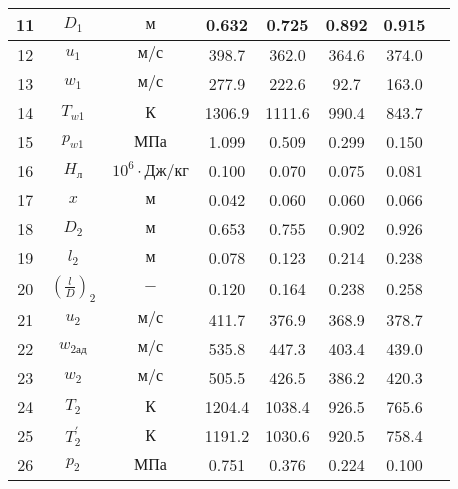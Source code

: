 \begin{landscape}
\begin{center}
\begin{longtable}{|c|c|c|c|c|c|c|c|}
            11 & $D_1$ & $м$ & 0.632 & 0.725 & 0.892 & 0.915 \\\hline
            
            12 & $u_1$ & $м/с$ & 398.7 & 362.0 & 364.6 & 374.0 \\\hline
            
            13 & $w_1$ & $м/с$ & 277.9 & 222.6 & 92.7 & 163.0 \\\hline
            
            14 & $T_{w1}$ & $К$ & 1306.9 & 1111.6 & 990.4 & 843.7 \\\hline
            
            15 & $p_{w1}$ & $МПа$ & 1.099 & 0.509 & 0.299 & 0.150 \\\hline
            
            16 & $H_л$ & $10^6 \cdot Дж/кг$ & 0.100 & 0.070 & 0.075 & 0.081 \\\hline
            
            17 & $x$ & $м$ & 0.042 & 0.060 & 0.060 & 0.066 \\\hline
            
            18 & $D_2$ & $м$ & 0.653 & 0.755 & 0.902 & 0.926 \\\hline
            
            19 & $l_2$ & $м$ & 0.078 & 0.123 & 0.214 & 0.238 \\\hline
            
            20 & $\left( \frac{l}{D} \right)_2$ & $-$ & 0.120 & 0.164 & 0.238 & 0.258 \\\hline
            
            21 & $u_2$ & $м/с$ & 411.7 & 376.9 & 368.9 & 378.7 \\\hline
            
            22 & $w_{2ад}$ & $м/с$ & 535.8 & 447.3 & 403.4 & 439.0 \\\hline
            
            23 & $w_2$ & $м/с$ & 505.5 & 426.5 & 386.2 & 420.3 \\\hline
            
            24 & $T_2$ & $К$ & 1204.4 & 1038.4 & 926.5 & 765.6 \\\hline
            
            25 & $T_2^\prime$ & $К$ & 1191.2 & 1030.6 & 920.5 & 758.4 \\\hline
            
            26 & $p_2$ & $МПа$ & 0.751 & 0.376 & 0.224 & 0.100 \\\hline
            

\end{longtable}
\end{center}
\end{landscape}

